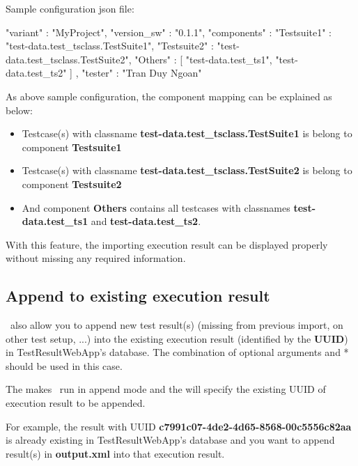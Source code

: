 Sample configuration json file:

\begin{pythoncode}
{
   "variant"    :  "MyProject",
   "version_sw" :  "0.1.1",
   "components" :  {
      "Testsuite1" :     "test-data.test_tsclass.TestSuite1",
      "Testsuite2" :     "test-data.test_tsclass.TestSuite2",
      "Others"     :     [
         "test-data.test_ts1",
         "test-data.test_ts2"
      ]
   },
   "tester"     :  "Tran Duy Ngoan"
}
\end{pythoncode}

As above sample configuration, the component mapping can be explained as
below:

\begin{itemize}
\tightlist
\item
  Testcase(s) with classname \textbf{test-data.test\_tsclass.TestSuite1}
  is belong to component \textbf{Testsuite1}
\item
  Testcase(s) with classname \textbf{test-data.test\_tsclass.TestSuite2}
  is belong to component \textbf{Testsuite2}
\item
  And component \textbf{Others} contains all testcases with classnames
  \textbf{test-data.test\_ts1} and \textbf{test-data.test\_ts2}.
\end{itemize}

With this feature, the importing execution result can be displayed
properly without missing any required information.

\hypertarget{append-to-existing-execution-result}{%
\subsection{Append to existing execution
result}\label{append-to-existing-execution-result}}

\pkg\ also allow you to append new test result(s) (missing from
previous import, on other test setup, ...) into the existing execution
result (identified by the \textbf{UUID}) in TestResultWebApp's database. 
The combination of optional arguments  and * 
should be used in this case.

The  makes \pkg\ run in append mode and the  
will specify the existing UUID of execution result to be appended.

For example, the result with UUID
\textbf{c7991c07-4de2-4d65-8568-00c5556c82aa} is already existing in
TestResultWebApp's database and you want to append
result(s) in \textbf{output.xml} into that execution result.

